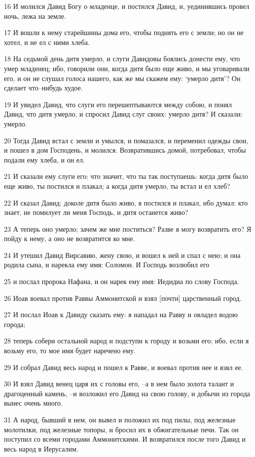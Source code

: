 \par 16 И молился Давид Богу о младенце, и постился Давид, и, уединившись провел ночь, лежа на земле.
\par 17 И вошли к нему старейшины дома его, чтобы поднять его с земли; но он не хотел, и не ел с ними хлеба.
\par 18 На седьмой день дитя умерло, и слуги Давидовы боялись донести ему, что умер младенец; ибо, говорили они, когда дитя было еще живо, и мы уговаривали его, и он не слушал голоса нашего, как же мы скажем ему: `умерло дитя'? Он сделает что--нибудь худое.
\par 19 И увидел Давид, что слуги его перешептываются между собою, и понял Давид, что дитя умерло, и спросил Давид слуг своих: умерло дитя? И сказали: умерло.
\par 20 Тогда Давид встал с земли и умылся, и помазался, и переменил одежды свои, и пошел в дом Господень, и молился. Возвратившись домой, потребовал, чтобы подали ему хлеба, и он ел.
\par 21 И сказали ему слуги его: что значит, что ты так поступаешь: когда дитя было еще живо, ты постился и плакал; а когда дитя умерло, ты встал и ел хлеб?
\par 22 И сказал Давид: доколе дитя было живо, я постился и плакал, ибо думал: кто знает, не помилует ли меня Господь, и дитя останется живо?
\par 23 А теперь оно умерло; зачем же мне поститься? Разве я могу возвратить его? Я пойду к нему, а оно не возвратится ко мне.
\par 24 И утешил Давид Вирсавию, жену свою, и вошел к ней и спал с нею; и она родила сына, и нарекла ему имя: Соломон. И Господь возлюбил его
\par 25 и послал пророка Нафана, и он нарек ему имя: Иедидиа по слову Господа.
\par 26 Иоав воевал против Раввы Аммонитской и взял [почти] царственный город.
\par 27 И послал Иоав к Давиду сказать ему: я нападал на Равву и овладел водою города;
\par 28 теперь собери остальной народ и подступи к городу и возьми его; ибо, если я возьму его, то мое имя будет наречено ему.
\par 29 И собрал Давид весь народ и пошел к Равве, и воевал против нее и взял ее.
\par 30 И взял Давид венец царя их с головы его, --а в нем было золота талант и драгоценный камень, --и возложил его Давид на свою голову, и добычи из города вынес очень много.
\par 31 А народ, бывший в нем, он вывел и положил их под пилы, под железные молотилки, под железные топоры, и бросил их в обжигательные печи. Так он поступил со всеми городами Аммонитскими. И возвратился после того Давид и весь народ в Иерусалим.

